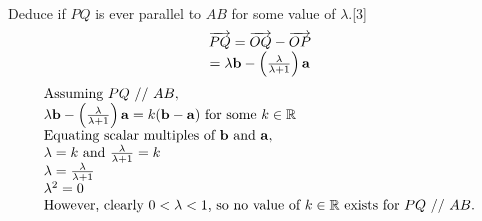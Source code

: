 \documentclass[12pt, a4 paper]{article}
\begin{document}
\begin{outline}[enumerate]
																						            
					\color{black}
					\2 Deduce if $PQ$ is ever parallel to $AB$ for some value of $\lambda$.\hfill[3]
					\color{blue}
					\[\begin{array}{c}\overrightarrow {PQ}  = \overrightarrow {OQ}  - \overrightarrow {OP} \\ = \lambda {\bf{b}} - \left( {\frac{\lambda }{{\lambda  + 1}}} \right){\bf{a}}\end{array}\]
					\[\begin{array}{l}{\textrm{Assuming }}PQ{\textrm{ // }}AB,\\\lambda {\bf{b}} - \left( {\frac{\lambda }{{\lambda  + 1}}} \right){\bf{a}} = k({\bf{b}} - {\bf{a}}){\textrm{ for some }}k \in \mathbb{R}\\{\textrm{Equating scalar multiples of }}{\bf{b}}{\textrm{ and }}{\bf{a}},\\\lambda  = k{\textrm{ and }}\frac{\lambda }{{\lambda  + 1}} = k\\\lambda  = \frac{\lambda }{{\lambda  + 1}}\\{\lambda ^2} = 0\\{\textrm{However, clearly }}0 < \lambda  < 1{\textrm{, so no value of }}k \in \mathbb{R}{\textrm{ exists for }}PQ{\textrm{ // }}AB.\end{array}\]
															

\end{outline}
\end{document}
